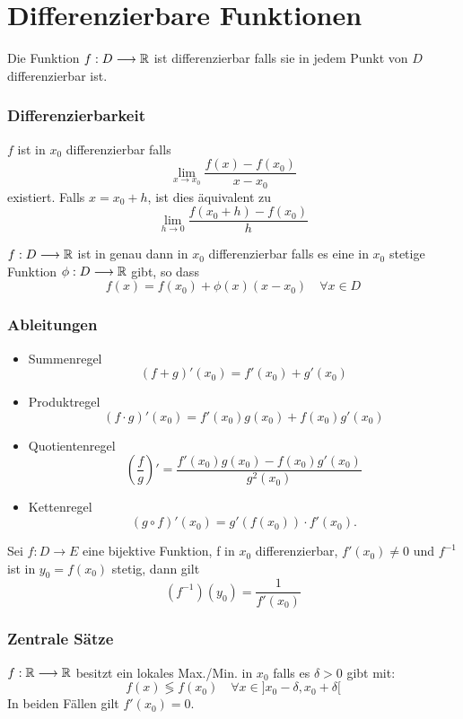\part{Differenzierbare Funktionen}
\setcounter{section}{0}
\Def Die Funktion $f: D \longrightarrow \mathbb{R}$ ist differenzierbar falls sie in jedem Punkt von $D$ differenzierbar ist.

\section{Differenzierbarkeit}

\Def $f$ ist in $x_0$ differenzierbar falls 
$$\lim \limits_{x \rightarrow x_{0}} \frac{f(x)-f\left(x_{0}\right)}{x-x_{0}}$$
existiert. Falls $x=x_0+h$, ist dies äquivalent zu
$$\lim \limits_{h \rightarrow 0} \frac{f\left(x_{0}+h\right)-f\left(x_{0}\right)}{h}$$

\Satz $f : D \longrightarrow \mathbb{R}$ ist in genau dann in $x_0$ differenzierbar falls es eine in $x_0$ stetige Funktion $\phi : D \longrightarrow \mathbb{R}$ gibt, so dass
$$f(x) = f(x_0) + \phi(x)(x-x_0) \quad \forall x \in D$$


\section{Ableitungen}
\Satz[Ableitungsregeln]
\begin{itemize}
  \item Summenregel
  \[(f+g)'(x_0) = f'(x_0) + g'(x_0)\]
  \item Produktregel
  \[(f\cdot g)'(x_0) = f'(x_0)g(x_0) + f(x_0)g'(x_0)\]
  \item Quotientenregel
  \[\left(\frac{f}{g}\right)'=
  \frac{f'(x_0)g(x_0) - f(x_0)g'(x_0)}{g^2(x_0)}\]
  \item Kettenregel \[
	(g\circ f)'(x_0) = g'(f(x_0))\cdot f'(x_0).
  \]
\end{itemize}

\Korollar[Inverse] Sei $f : D \longrightarrow E$ eine bijektive Funktion, f in $x_0$ differenzierbar, $f'(x_0) \neq 0$ und $f^{-1}$ ist in $y_0 = f(x_0)$ stetig, dann gilt
$$(f^{-1})(y_0) = \frac{1}{f'(x_0)}$$

\section{Zentrale Sätze}
\Satz[Extrema] $f : \mathbb{R} \longrightarrow \mathbb{R}$ besitzt ein lokales Max./Min. in $x_0$ falls es $\delta >0$ gibt mit:
		$$f(x) \lessgtr f(x_0) \quad \forall x \in ]x_0-\delta, x_0+\delta[ $$
In beiden Fällen gilt $f'(x_0) = 0$.

